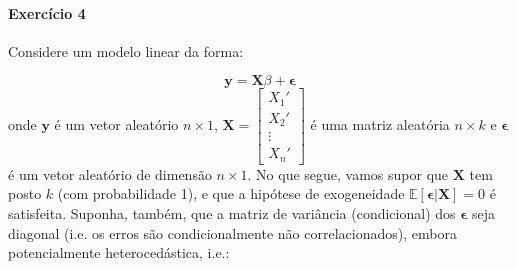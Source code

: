 \documentclass[10pt,a4paper]{article}
\begin{document}
 
 \paragraph{Exercício 4} Considere um modelo linear da forma:
 
 $$\boldsymbol{y} = \boldsymbol{X}\beta + \boldsymbol{\epsilon}$$
 onde $\boldsymbol{y}$ é um vetor aleatório $n\times 1$, $\boldsymbol{X} = \begin{bmatrix}
 	X_1' \\
 	X_2' \\
 	\vdots \\
 	X_n'
 \end{bmatrix}$ é uma matriz aleatória $n \times k$ e $\boldsymbol{\epsilon}$ é um vetor aleatório de dimensão $n \times 1$. No que segue, vamos supor que $\boldsymbol{X}$ tem posto $k$ (com probabilidade 1), e que a hipótese de exogeneidade $\mathbb{E}[\boldsymbol{\epsilon}|\boldsymbol{X}] = 0$ é satisfeita. Suponha, também, que a matriz de variância  (condicional) dos $\boldsymbol{\epsilon}$ seja diagonal (i.e. os erros são condicionalmente não correlacionados), embora potencialmente heterocedástica, i.e.:
 
\end{document}
